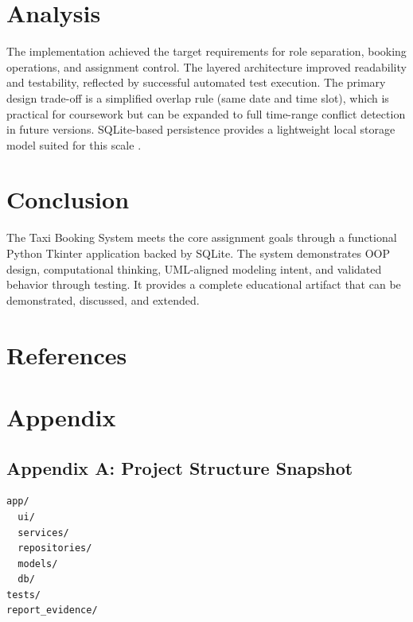 \documentclass[12pt,a4paper]{article}
\begin{document}
\section{Analysis}
The implementation achieved the target requirements for role separation, booking operations, and assignment control. The layered architecture improved readability and testability, reflected by successful automated test execution. The primary design trade-off is a simplified overlap rule (same date and time slot), which is practical for coursework but can be expanded to full time-range conflict detection in future versions. SQLite-based persistence provides a lightweight local storage model suited for this scale \citep{sqlite}.

\section{Conclusion}
The Taxi Booking System meets the core assignment goals through a functional Python Tkinter application backed by SQLite. The system demonstrates OOP design, computational thinking, UML-aligned modeling intent, and validated behavior through testing. It provides a complete educational artifact that can be demonstrated, discussed, and extended.

\section{References}



\section{Appendix}
\subsection*{Appendix A: Project Structure Snapshot}
\begin{lstlisting}
app/
  ui/
  services/
  repositories/
  models/
  db/
tests/
report_evidence/
\end{lstlisting}
\end{document}
